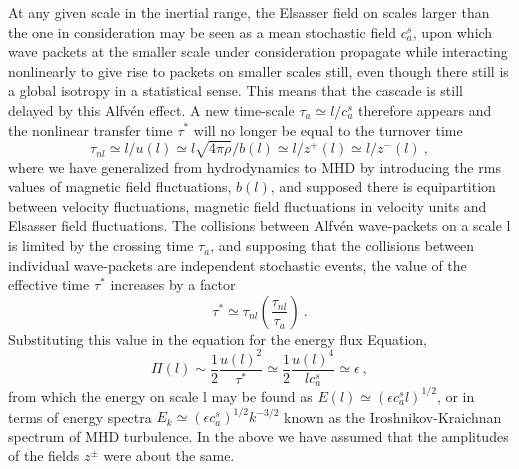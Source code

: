 \documentclass[12pt,a4paper]{article}
\begin{document}
At any given scale in the inertial range, the Elsasser field on scales larger than the one in consideration may be seen as a mean stochastic field $c_a^s$, upon which wave packets at the smaller scale under consideration propagate while interacting nonlinearly to give rise to packets on smaller scales still, even though there still is a global isotropy in a statistical sense. This means that the cascade is still delayed by this Alfvén effect. A new time-scale $\tau_a \simeq l/c_a^s$ therefore appears and the nonlinear transfer time $\tau^\ast$ will no longer be equal to the turnover time
\begin{equation}
\tau_{nl} \simeq l/u(l) \simeq l\sqrt{4\pi \rho}/b(l) \simeq l/z^+(l) \simeq l/z^-(l) ~,
\end{equation}
where we have generalized from hydrodynamics to MHD by introducing the rms values of magnetic field fluctuations, $b(l)$, and supposed there is equipartition between velocity fluctuations, magnetic field fluctuations in velocity units and Elsasser field fluctuations. The collisions between Alfv\'en wave-packets on a scale l is limited by the crossing time $\tau_a$, and supposing that the collisions between individual wave-packets are independent stochastic events, the value of the effective time $\tau^\ast$ increases by a factor
\begin{equation}
\tau^\ast \simeq \tau_{nl} \left(\dfrac{\tau_{nl}}{\tau_a} \right) ~.
\end{equation}
Substituting this value in the equation for the energy flux Equation,
\begin{equation}
\Pi(l) \sim \dfrac{1}{2} \dfrac{u(l)^2}{\tau^\ast} \simeq  \dfrac{1}{2} \dfrac{u(l)^4}{l c^s_a} \simeq \epsilon ~,
\end{equation}
from which the energy on scale l may be found as $E(l) ≃ (\epsilon c_a^s l)^{1/2}$, or in terms of energy spectra $E_k \simeq (\epsilon c_a^s)^{1/2} k^{-3/2}$ known as the Iroshnikov-Kraichnan spectrum of MHD turbulence. In the above we have assumed that the amplitudes of the fields $z^\pm$ were about the same.
\end{document}
